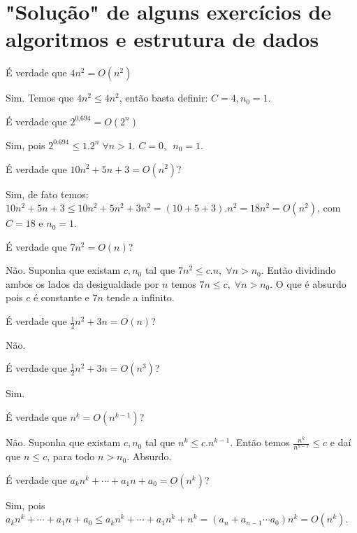 \documentclass{exam}
\begin{document}
	
	\section{"Solução" de alguns exercícios de algoritmos e estrutura de dados}
	
	\cancelspace
	
	\begin{questions}
		
		\question  É verdade que $4n^2 = O(n^2)$ 
		\begin{solution}[.2in]
			Sim. Temos que $4n^2 \le 4n^2$, então basta definir: $C = 4, n_0 = 1$.
		\end{solution} 
		
		\question É verdade que $2^{0.694} = O(2^n)$
		\begin{solution}
			Sim, pois $2^{0.694} \le 1.2^n \; \forall n > 1$. $C = 0, \;\ n_0 = 1$.
		\end{solution}
		
		\question É verdade que $10n^2 + 5n + 3 = O(n^2)$?
		\begin{solution}
			Sim, de fato temos: $10n^2 + 5n + 3 \le 10n^2 + 5n^2 + 3n^2 = (10 + 5 + 3).n^2 = 18n^2 = O(n^2)$, com $C = 18$ e $n_0 = 1$.
		\end{solution}
	
		\question É verdade que $7n^2 = O(n)$?
		\begin{solution}
			Não. Suponha que existam $c,n_0$ tal que $7n^2 \le c.n, \; \forall n > n_0$. Então dividindo ambos os lados da desigualdade
			por $n$ temos $7n \le c, \; \forall n > n_0$. O que é absurdo pois $c$ é constante e $7n$ tende a infinito.
		\end{solution}
		
		\question É verdade que $\frac{1}{2}n^2 + 3n = O(n)$?
		\begin{solution}
			Não.
		\end{solution}
	
		\question É verdade que $\frac{1}{2}n^2 + 3n = O(n^3)$?
		\begin{solution}
			Sim.
		\end{solution}

		\question É verdade que $n^k = O(n^{k-1})$?
		\begin{solution}
		Não. Suponha que existam $c,n_0$ tal que $n^k \le c . n^{k-1}$. Então temos $\frac{n^k}{n^{k-1}} \le c$ e 
		daí que $n \le c$, para todo $n > n_0$. Absurdo.  
		\end{solution}
	
		\question É verdade que $a_kn^k + \cdots + a_1n + a_0 = O(n^k)$?
		\begin{solution}
			Sim, pois  $a_kn^k + \cdots + a_1n + a_0 \le a_kn^k + \cdots + a_1n^k + n^k =
			(a_n + a_{n-1} \cdots a_0)n^k = O(n^k)$.
		\end{solution}
				

\end{questions}
\end{document}
